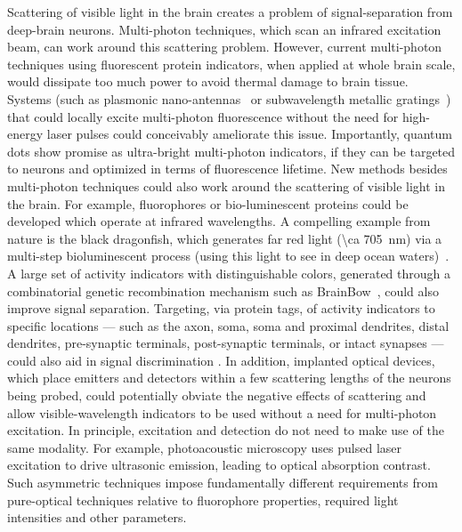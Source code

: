 Scattering of visible light in the brain creates a problem of signal-separation from deep-brain neurons.
Multi-photon techniques, which scan an infrared excitation beam, can work around this scattering problem.
However, current multi-photon techniques using fluorescent protein indicators, when applied at whole brain scale, would dissipate too much power to avoid thermal damage to brain tissue.
Systems (such as plasmonic nano-antennas~\cite{blanchard11} or subwavelength metallic gratings~\cite{Harats11}) that could locally excite multi-photon fluorescence without the need for high-energy laser pulses could conceivably ameliorate this issue. 
Importantly, quantum dots show promise as ultra-bright multi-photon indicators, if they can be targeted to neurons and optimized in terms of fluorescence lifetime.
New methods besides multi-photon techniques could also work around the scattering of visible light in the brain.
For example, fluorophores or bio-luminescent proteins could be developed which operate at infrared wavelengths.
A compelling example from nature is the black dragonfish, which generates far red light (\SI{\ca 705}{\nano\meter}) via a multi-step bioluminescent process (using this light to see in deep ocean waters)~\cite{widder84,campbell87}.
A large set of activity indicators with distinguishable colors, generated through a combinatorial genetic recombination mechanism such as BrainBow~\cite{livet07}, could also improve signal separation.
Targeting, via protein tags, of activity indicators to specific locations --- such as the axon, soma, soma and proximal dendrites, distal dendrites, pre-synaptic terminals, post-synaptic terminals, or intact synapses --- could also aid in signal discrimination \cite{arnold2007polarized, el2001polarized, correa2009rapid, jacobs2003soma, vacher2008localization, boeckers2005c, feinberg2008gfp, yamagata2012transgenic}. In addition, implanted optical devices, which place emitters and detectors within a few scattering lengths of the neurons being probed, could potentially obviate the negative effects of scattering and allow visible-wavelength indicators to be used without a need for multi-photon excitation. In principle, excitation and detection do not need to make use of the same modality. For example, photoacoustic microscopy \cite{filonov12} uses pulsed laser excitation to drive ultrasonic emission, leading to optical absorption contrast. Such asymmetric techniques impose fundamentally different requirements from pure-optical techniques relative to fluorophore properties, required light intensities and other parameters.

